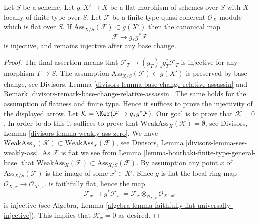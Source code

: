 \begin{lemma}
\label{lemma-universally-separating}
Let $S$ be a scheme.
Let $g : X' \to X$ be a flat morphism of schemes over $S$
with $X$ locally of finite type over $S$.
Let $\mathcal{F}$ be a finite type quasi-coherent $\mathcal{O}_X$-module
which is flat over $S$. If $\text{Ass}_{X/S}(\mathcal{F}) \subset g(X')$
then the canonical map
$$
\mathcal{F} \longrightarrow g_*g^*\mathcal{F}
$$
is injective, and remains injective after any base change.
\end{lemma}

\begin{proof}
The final assertion means that $\mathcal{F}_T \to (g_T)_*g_T^*\mathcal{F}_T$
is injective for any morphism $T \to S$. The assumption
$\text{Ass}_{X/S}(\mathcal{F}) \subset g(X')$ is preserved by base change, see
Divisors, Lemma \ref{divisors-lemma-base-change-relative-assassin} and
Remark \ref{divisors-remark-base-change-relative-assassin}.
The same holds for the assumption of flatness and finite type.
Hence it suffices to prove the injectivity of the displayed arrow.
Let $\mathcal{K} = \Ker(\mathcal{F} \to g_*g^*\mathcal{F})$.
Our goal is to prove that $\mathcal{K} = 0$.
In order to do this it suffices to prove that
$\text{WeakAss}_X(\mathcal{K}) = \emptyset$, see
Divisors, Lemma \ref{divisors-lemma-weakly-ass-zero}.
We have
$\text{WeakAss}_X(\mathcal{K}) \subset \text{WeakAss}_X(\mathcal{F})$, see
Divisors, Lemma \ref{divisors-lemma-ses-weakly-ass}.
As $\mathcal{F}$ is flat we see from
Lemma \ref{lemma-bourbaki-finite-type-general-base}
that $\text{WeakAss}_X(\mathcal{F}) \subset \text{Ass}_{X/S}(\mathcal{F})$.
By assumption any point $x$ of $\text{Ass}_{X/S}(\mathcal{F})$
is the image of some $x' \in X'$. Since $g$ is flat the
local ring map $\mathcal{O}_{X, x} \to \mathcal{O}_{X', x'}$
is faithfully flat, hence the map
$$
\mathcal{F}_x
\longrightarrow
g^*\mathcal{F}_{x'} =
\mathcal{F}_x \otimes_{\mathcal{O}_{X, x}} \mathcal{O}_{X', x'}
$$
is injective (see
Algebra, Lemma \ref{algebra-lemma-faithfully-flat-universally-injective}).
This implies that $\mathcal{K}_x = 0$ as desired.
\end{proof}

